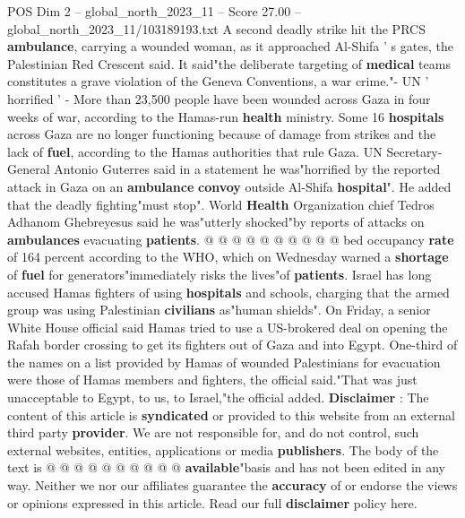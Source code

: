 \begin{textsample}{POS Dim 2 – global\_north\_2023\_11 – Score 27.00 – global\_north\_2023\_11/103189193.txt}
A second deadly strike hit the PRCS \textbf{ambulance}, carrying a wounded woman, as it approached Al-Shifa ' s gates, the Palestinian Red Crescent said.
It said"the deliberate targeting of \textbf{medical} teams constitutes a grave violation of the Geneva Conventions, a war crime."- UN ' horrified ' - More than 23,500 people have been wounded across Gaza in four weeks of war, according to the Hamas-run \textbf{health} ministry.
Some 16 \textbf{hospitals} across Gaza are no longer functioning because of damage from strikes and the lack of \textbf{fuel}, according to the Hamas authorities that rule Gaza.
UN Secretary-General Antonio Guterres said in a statement he was"horrified by the reported attack in Gaza on an \textbf{ambulance} \textbf{convoy} outside Al-Shifa \textbf{hospital}".
He added that the deadly fighting"must stop".
World \textbf{Health} Organization chief Tedros Adhanom Ghebreyesus said he was"utterly shocked"by reports of attacks on \textbf{ambulances} evacuating \textbf{patients}. @ @ @ @ @ @ @ @ @ @ bed occupancy \textbf{rate} of 164 percent according to the WHO, which on Wednesday warned a \textbf{shortage} of \textbf{fuel} for generators"immediately risks the lives"of \textbf{patients}.
Israel has long accused Hamas fighters of using \textbf{hospitals} and schools, charging that the armed group was using Palestinian \textbf{civilians} as"human shields".
On Friday, a senior White House official said Hamas tried to use a US-brokered deal on opening the Rafah border crossing to get its fighters out of Gaza and into Egypt.
One-third of the names on a list provided by Hamas of wounded Palestinians for evacuation were those of Hamas members and fighters, the official said."That was just unacceptable to Egypt, to us, to Israel,"the official added. \textbf{Disclaimer} : The content of this article is \textbf{syndicated} or provided to this website from an external third party \textbf{provider}.
We are not responsible for, and do not control, such external websites, entities, applications or media \textbf{publishers}.
The body of the text is @ @ @ @ @ @ @ @ @ @ \textbf{available}"basis and has not been edited in any way.
Neither we nor our affiliates guarantee the \textbf{accuracy} of or endorse the views or opinions expressed in this article.
Read our full \textbf{disclaimer} policy here.

\end{textsample}
